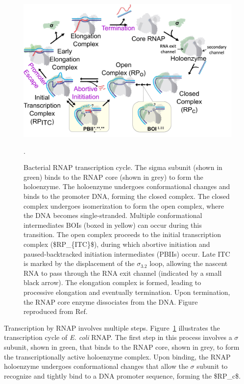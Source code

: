 \begin{figure}
    \centering
    \includegraphics[width=\textwidth]{chapters/figures/transcription_initiation.jpg}
    \caption{\label{fig:transcription_cycle}Bacterial RNAP transcription cycle. 
    The sigma subunit (shown in green) binds to the RNAP core (shown in grey) to form the holoenzyme. 
    The holoenzyme undergoes conformational changes and binds to the promoter DNA, forming the closed complex. 
    The closed complex undergoes isomerization to form the open complex, where the DNA becomes single-stranded. Multiple conformational intermediates \ac{BOIs} (boxed in yellow) can occur during this transition. 
    The open complex proceeds to the initial transcription complex (\ac{$RP_{ITC}$}), during which abortive initiation and paused-backtracked initiation intermediates (\ac{PBIIs}) occur. 
    Late ITC is marked by the displacement of the $\sigma_{3.2}$ loop, allowing the nascent RNA to pass through the RNA exit channel (indicated by a small black arrow).
    The elongation complex is formed, leading to processive elongation and eventually termination. 
    Upon termination, the RNAP core enzyme dissociates from the DNA.
    Figure reproduced from Ref.~\cite{lerner_PNAS_2016}}.
\end{figure}

Transcription by RNAP involves multiple steps. 
Figure~\ref{fig:transcription_cycle} illustrates the transcription cycle of \textit{\ac{E. coli}} RNAP. 
The first step in this process involves a $\sigma$ subunit, shown in green, that binds to the RNAP core, shown in grey, to form the transcriptionally active holoenzyme complex.
Upon binding, the RNAP holoenzyme undergoes conformational changes that allow the $\sigma$ subunit to recognize and tightly bind to a DNA promoter sequence, forming the \ac{$RP_c$}. 

